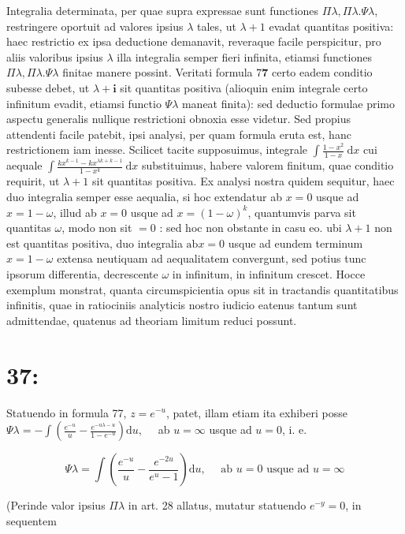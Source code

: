 \documentclass[10pt]{article}
\begin{document}
Integralia determinata, per quae supra expressae sunt functiones \(\Pi \lambda, \Pi \lambda . \Psi \lambda\), restringere oportuit ad valores ipsius \(\lambda\) tales, ut \(\lambda+1\) evadat quantitas positiva: haec restrictio ex ipsa deductione demanavit, reveraque facile perspicitur, pro aliis valoribus ipsius \(\lambda\) illa integralia semper fieri infinita, etiamsi functiones \(\Pi \lambda, \Pi \lambda . \Psi \lambda\) finitae manere possint. Veritati formula \(7 \mathbf{7}\) certo eadem conditio subesse debet, ut \(\lambda+\mathbf{i}\) sit quantitas positiva (alioquin enim integrale certo infinitum evadit, etiamsi functio \(\Psi \lambda\) maneat finita): sed deductio formulae primo aspectu generalis nullique restrictioni obnoxia esse videtur. Sed propius attendenti facile patebit, ipsi analysi, per quam formula eruta est, hanc restrictionem iam inesse. Scilicet tacite supposuimus, integrale \(\int \frac{1-x^{2}}{1-x} \mathrm{~d} x\) cui aequale \(\int \frac{k x^{k-1}-k x^{\lambda k+k-1}}{1-x^{k}} \mathrm{~d} x\) substituimus, habere valorem finitum, quae conditio requirit, ut \(\lambda+1\) sit quantitas positiva. Ex analysi nostra quidem sequitur, haec duo integralia semper esse aequalia, si hoc extendatur ab \(x=0\) usque ad \(x=1-\omega\), illud ab \(x=0\) usque ad \(x=(1-\omega)^{k}\), quantumvis parva sit quantitas \(\omega\), modo non sit \(=0\) : sed hoc non obstante in casu eo. ubi \(\lambda+1\) non est quantitas positiva, duo integralia \(\mathrm{ab} x=0\) usque ad eundem terminum \(x=1-\omega\) extensa neutiquam ad aequalitatem convergunt, sed potius tunc ipsorum differentia, decrescente \(\omega\) in infinitum, in infinitum crescet. Hocce exemplum monstrat, quanta circumspicientia opus sit in tractandis quantitatibus infinitis, quae in ratiociniis analyticis nostro iudicio eatenus tantum sunt admittendae, quatenus ad theoriam limitum reduci possunt.

\section*{37:}
Statuendo in formula 77, \(z=e^{-u}\), patet, illam etiam ita exhiberi posse \(\Psi \lambda=-\int\left(\frac{e^{-u}}{u}-\frac{e^{-u \lambda-u}}{1-e^{-u}}\right) \mathrm{d} u, \quad\) ab \(u=\infty\) usque ad \(u=0\), i. e.

\[
\Psi \lambda=\int\left(\frac{e^{-u}}{u}-\frac{e^{-2 u}}{e^{u}-1}\right) \mathrm{d} u, \quad \text { ab } u=0 \text { usque ad } u=\infty
\]

(Perinde valor ipsius \(\Pi \lambda\) in art. 28 allatus, mutatur statuendo \(e^{-y}=0\), in sequentem
\end{document}
